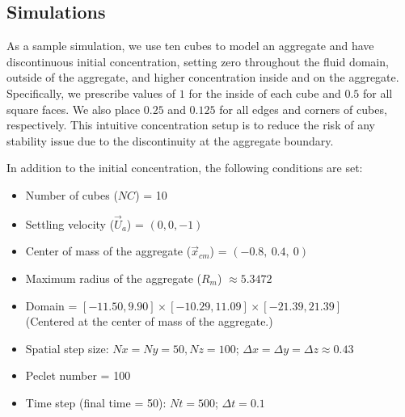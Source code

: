\subsection{Simulations}
As a sample simulation, we use ten cubes to model an aggregate and have discontinuous initial concentration, setting zero throughout the fluid domain, outside of the aggregate, and higher concentration inside and on the aggregate. Specifically, we prescribe values of $1$ for the inside of each cube and $0.5$ for all square faces. We also place $0.25$ and $0.125$ for all edges and corners of cubes, respectively. 
This intuitive concentration setup is to reduce the risk of any stability issue due to the discontinuity at the aggregate boundary. 

In addition to the initial concentration, the following conditions are set:
\begin{framed}
\begin{itemize}
	\item Number of cubes ($NC$) = 10
	\item Settling velocity ($\vec{U}_a$) = $(0,0,-1)$
	\item Center of mass of the aggregate ($\vec{x}_{cm}$) = $(-0.8, \  0.4, \ 0)$
	\item Maximum radius of the aggregate ($R_m$) $\approx 5.3472$
	\item Domain = $[-11.50, 9.90] \times [-10.29, 11.09] \times [-21.39, 21.39]$\\
	(Centered at the center of mass of the aggregate.)
	\item Spatial step size: $Nx = Ny = 50, Nz = 100$; $\Delta x = \Delta y = \Delta z \approx 0.43$
	\item Peclet number = 100
	\item Time step (final time = 50): $Nt = 500$; $\Delta t = 0.1$
\end{itemize}
\end{framed}

